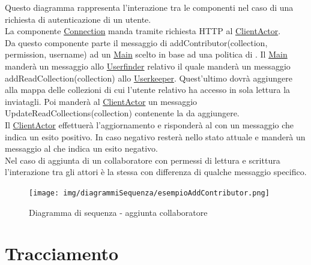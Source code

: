 \documentclass{scalatekids-article}
\begin{document}
Questo diagramma rappresenta l'interazione tra le componenti nel caso di una richiesta di autenticazione di un utente.\\
La componente \hyperref[sec:actorbase::driver::client::Connection]{Connection}
manda tramite richiesta HTTP al \hyperref[sec:actorbase::actorsystem::actors::clientactor::ClientActor]{ClientActor}.\\
Da questo componente parte il messaggio di addContributor(collection, permission, username) ad un
\hyperref[sec:actorbase::actorsystem::actors::main::Main]{Main} scelto in base ad una
politica di . Il \hyperref[sec:actorbase::actorsystem::actors::main::Main]{Main} manderà un messaggio allo
\hyperref[sec:actorbase::actorsystem::actors::userfinder]{Userfinder}
relativo il quale manderà un messaggio addReadCollection(collection) allo
\hyperref[sec:actorbase::actorsystem::actors::userkeeper::Userkeeper]{Userkeeper}.
Quest'ultimo dovrà aggiungere alla mappa delle collezioni di cui l'utente
relativo ha accesso in sola lettura la  inviatagli.
Poi manderà al \hyperref[sec:actorbase::actorsystem::actors::clientactor::ClientActor]{ClientActor} un messaggio UpdateReadCollections(collection)
contenente la  da aggiungere.\\
Il \hyperref[sec:actorbase::actorsystem::actors::clientactor::ClientActor]{ClientActor} effettuerà l'aggiornamento e risponderà al 
con un messaggio che indica un esito positivo. In caso negativo resterà nello
stato attuale e manderà un messaggio al  che indica un esito
negativo.\\ Nel caso di aggiunta di un collaboratore con permessi di lettura e scrittura
l'interazione tra gli attori è la stessa con differenza di qualche messaggio
specifico.\\
\begin{figure}[H]
  \begin{center}
    \texttt{[image: img/diagrammiSequenza/esempioAddContributor.png]}
    \caption{Diagramma di sequenza - aggiunta collaboratore}
  \end{center}
\end{figure}





\section{Tracciamento}
\end{document}
